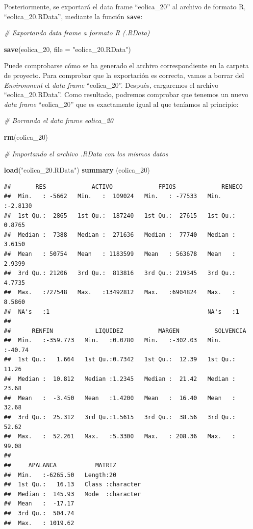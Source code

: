\documentclass[
]{book}
\newenvironment{Shaded}{\begin{snugshade}}{\end{snugshade}}
\newcommand{\AttributeTok}[1]{\textcolor[rgb]{0.13,0.29,0.53}{#1}}
\newcommand{\CommentTok}[1]{\textcolor[rgb]{0.56,0.35,0.01}{\textit{#1}}}
\newcommand{\FunctionTok}[1]{\textcolor[rgb]{0.13,0.29,0.53}{\textbf{#1}}}
\newcommand{\NormalTok}[1]{#1}
\newcommand{\StringTok}[1]{\textcolor[rgb]{0.31,0.60,0.02}{#1}}
\begin{document}
Posteriormente, se exportará el data frame ``eolica\_20'' al archivo de formato R, ``eolica\_20.RData'', mediante la función \texttt{save}:

\begin{Shaded}
\begin{Highlighting}[]
\CommentTok{\# Exportando data frame a formato R (.RData)}

\FunctionTok{save}\NormalTok{(eolica\_20, }\AttributeTok{file =} \StringTok{"eolica\_20.RData"}\NormalTok{)}
\end{Highlighting}
\end{Shaded}

Puede comprobarse cómo se ha generado el archivo correspondiente en la carpeta de proyecto. Para comprobar que la exportación es correcta, vamos a borrar del \emph{Environment} el \emph{data frame} ``eolica\_20''. Después, cargaremos el archivo ``eolica\_20.RData''. Como resultado, podremos comprobar que tenemos un nuevo \emph{data frame} ``eolica\_20'' que es exactamente igual al que teníamos al principio:

\begin{Shaded}
\begin{Highlighting}[]
\CommentTok{\# Borrando el data frame eolica\_20}

\FunctionTok{rm}\NormalTok{(eolica\_20)}

\CommentTok{\# Importando el archivo .RData con los mismos datos}

\FunctionTok{load}\NormalTok{(}\StringTok{"eolica\_20.RData"}\NormalTok{)}
\FunctionTok{summary}\NormalTok{ (eolica\_20)}
\end{Highlighting}
\end{Shaded}

\begin{verbatim}
##       RES             ACTIVO             FPIOS             RENECO       
##  Min.   : -5662   Min.   :  109024   Min.   : -77533   Min.   :-2.8130  
##  1st Qu.:  2865   1st Qu.:  187240   1st Qu.:  27615   1st Qu.: 0.8765  
##  Median :  7388   Median :  271636   Median :  77740   Median : 3.6150  
##  Mean   : 50754   Mean   : 1183599   Mean   : 563678   Mean   : 2.9399  
##  3rd Qu.: 21206   3rd Qu.:  813816   3rd Qu.: 219345   3rd Qu.: 4.7735  
##  Max.   :727548   Max.   :13492812   Max.   :6904824   Max.   : 8.5860  
##  NA's   :1                                             NA's   :1        
## 
##      RENFIN            LIQUIDEZ          MARGEN          SOLVENCIA     
##  Min.   :-359.773   Min.   :0.0780   Min.   :-302.03   Min.   :-40.74  
##  1st Qu.:   1.664   1st Qu.:0.7342   1st Qu.:  12.39   1st Qu.: 11.26  
##  Median :  10.812   Median :1.2345   Median :  21.42   Median : 23.68  
##  Mean   :  -3.450   Mean   :1.4200   Mean   :  16.40   Mean   : 32.68  
##  3rd Qu.:  25.312   3rd Qu.:1.5615   3rd Qu.:  38.56   3rd Qu.: 52.62  
##  Max.   :  52.261   Max.   :5.3300   Max.   : 208.36   Max.   : 99.08  
## 
##     APALANCA           MATRIZ         
##  Min.   :-6265.50   Length:20         
##  1st Qu.:   16.13   Class :character  
##  Median :  145.93   Mode  :character  
##  Mean   :  -17.17                     
##  3rd Qu.:  504.74                     
##  Max.   : 1019.62
\end{verbatim}
\end{document}
